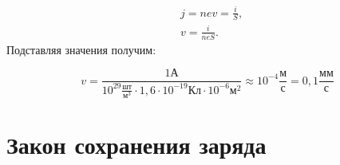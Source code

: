    \begin{solution}
        \begin{align*}
            & j = nev = \frac{i}{S}, \\
            & v = \frac{i}{neS}.
        \end{align*}
        Подставляя значения получим:
        
        \[
            v = \frac{1 \text{А}}{10^{29} \frac{\text{шт}}{\text{м}^3} \cdot
            1,6 \cdot 10^{-19} \text{Кл} \cdot 10^{-6} \text{м}^2} \approx
            10^{-4} \frac{\text{м}}{\text{с}} = 0,1 \frac{\text{мм}}{\text{с}}
        \]

    \end{solution}
    
\section{Закон сохранения заряда}

